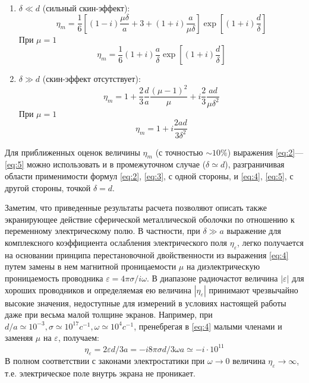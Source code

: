 \begin{enumerate}
	\item $\delta \ll d$ (сильный скин-эффект):
	\begin{equation} 
		\eta_{m}=\frac{1}{6}\left[(1-i) \frac{\mu \delta}{a}+3+(1+i) \frac{a}{\mu \delta}\right] \exp \left[(1+i) \frac{d}{\delta}\right]
	\label{eq:2}
	\end{equation}
При $\mu=1$
\begin{equation} 
	\eta_{m}=\frac{1}{6}(1+i) \frac{a}{\delta} \exp \left[(1+i) \frac{d}{\delta}\right]
\label{eq:3}
\end{equation}

	\item $\delta \gg d$ (скин-эффект отсутствует):
	\begin{equation}
		\eta_{m}=1+\frac{2}{3}\frac{d}{a}\frac{(\mu-1)^2}{\mu}+i\frac{2}{3}\frac{ad}{\mu \delta^2}
	\label{eq:4}
	\end{equation}
При $\mu=1$
\begin{equation} 
\eta_{m}=1+i \frac{2 a d}{3 \delta^{2}}
\label{eq:5}
\end{equation}
\end{enumerate}

Для приближенных оценок величины $\eta_{m}$ (с точностью $\sim10\%$) выражения \eqref{eq:2}—\eqref{eq:5} можно использовать и в промежуточном случае ($\delta \simeq d$), разграничивая области применимости формул \eqref{eq:2}, \eqref{eq:3}, с одной стороны, и \eqref{eq:4}, \eqref{eq:5}, с другой стороны, точкой $\delta = d$.

Заметим, что приведенные результаты расчета позволяют описать также экранирующее действие сферической металлической оболочки по отношению к переменному электрическому полю. В частности, при $\delta \gg a$ выражение для комплексного коэффициента ослабления электрического поля $\eta_{\varepsilon}$, легко получается на основании принципа перестановочной двойственности из выражения \eqref{eq:4} путем замены в нем магнитной проницаемости $\mu$ на диэлектрическую проницаемость проводника $\varepsilon=4\pi \sigma / i \omega$. В диапазоне радиочастот величина $|\varepsilon|$ для хороших проводников и определяемая ею величина $|\eta_{\varepsilon}|$ принимают чрезвычайно высокие значения, недоступные для измерений в условиях настоящей работы даже при весьма малой толщине экранов. Например, при $d/a \simeq 10^{-3}, \sigma \simeq 10^{17} c^{-1}, \omega \simeq 10^{4} c^{-1}$, пренебрегая в \eqref{eq:4} малыми членами и заменяя $\mu$ на $\varepsilon$, получаем:
\begin{equation} 
	\eta_{\varepsilon}=2 \varepsilon d / 3 a=-i 8 \pi \sigma d / 3 \omega a \simeq-i \cdot 10^{11}
\end{equation}
В полном соответствии с законами электростатики при $\omega\rightarrow 0 $ величина $\eta_{\varepsilon} \rightarrow \infty $, т.е. электрическое поле внутрь экрана не проникает.
